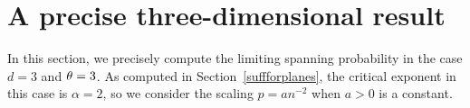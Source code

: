 \section{A precise three-dimensional result}
\label{3d-precise}
In this section, we precisely compute the limiting spanning probability in the case $d=3$ and $\theta=3$.  As computed in Section~\ref{suffforplanes}, the critical exponent in this case is $\alpha=2$, so we consider the scaling $p = a n^{-2}$ when $a>0$ is a constant.

\begin{comment}
\begin{theorem}
\label{3d-spanning-thm}
Let $d=3$, $\threshold=3$ and $p = an^{-2}$ with $a>0$.  Then as $n\to \infty$
\begin{equation}
\prob_{p}(\omega_\infty \equiv1) \to 1 - e^{-a^3 - (3/2)a^2(1-e^{-2a})}\left[\frac{3}{2} a^2\left(\left(e^{-a}+ae^{-3a}\right)^2-e^{-2a}\right)e^{-a^2e^{-2a}} + e^{a^3e^{-3a}} \right].
\end{equation}
\end{theorem}
\end{comment}

